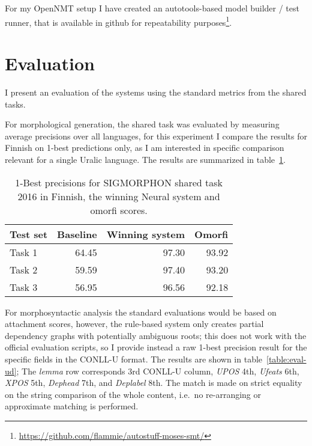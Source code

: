 \documentclass[a4paper,notitlepage]{article}
\begin{document}
For my OpenNMT setup I have created an autotools-based model builder / test
runner, that is available in github for repeatability
purposes\footnote{\url{https://github.com/flammie/autostuff-moses-smt/}}.

\section{Evaluation}
\label{sec:evaluation}

I present an evaluation of the systems using the standard metrics from the
shared tasks.

For morphological generation, the shared task was evaluated by measuring average
precisions over all languages, for this experiment I compare the results for
Finnish on 1-best predictions only, as I am interested in specific comparison
relevant for a single Uralic language. The results are summarized in
table~\ref{table:eval-sigmorphon}.

\begin{table}
\begin{centering}
    \begin{tabular}{lrrr}
        \toprule
        Test set & \bf Baseline & \bf Winning system & \bf Omorfi \\
        \midrule
        Task 1 & 64.45 & 97.30 & 93.92 \\
        Task 2 & 59.59 & 97.40 & 93.20 \\
        Task 3 & 56.95 & 96.56 & 92.18 \\
        \bottomrule
    \end{tabular}
    \caption{1-Best precisions for SIGMORPHON shared task 2016 in Finnish,
    the winning Neural system and omorfi scores.
\label{table:eval-sigmorphon}}
\end{centering}
\end{table}

For morphosyntactic analysis the standard evaluations would be based on
attachment scores, however, the rule-based system only creates partial
dependency graphs with potentially ambiguous roots; this does not work with
the official evaluation scripts, so I provide instead a raw 1-best precision
result for the specific fields in the CONLL-U format. The results
are shown in table~\ref{table:eval-ud}; The \textit{lemma} row corresponds
3rd CONLL-U column, \textit{UPOS} 4th, \textit{Ufeats} 6th, \textit{XPOS} 5th,
\textit{Dephead} 7th, and \textit{Deplabel} 8th. The match is made on strict
equality on the string comparison of the whole content, i.e.\ no re-arranging or
approximate matching is performed.
\end{document}
